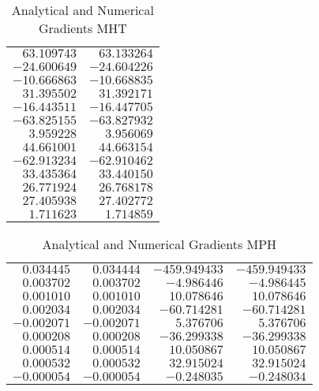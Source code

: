 \begin{table}[ht]
\caption{Analytical and Numerical Gradients MHT}
\begin{center}
\begin{tabular}{rr}
$63.109743$&$63.133264$\\
$-24.600649$&$-24.604226$\\
$-10.666863$&$-10.668835$\\
$31.395502$&$31.392171$\\
$-16.443511$&$-16.447705$\\
$-63.825155$&$-63.827932$\\
$3.959228$&$3.956069$\\
$44.661001$&$44.663154$\\
$-62.913234$&$-62.910462$\\
$33.435364$&$33.440150$\\
$26.771924$&$26.768178$\\
$27.405938$&$27.402772$\\
$1.711623$&$1.714859$\\
\end{tabular}
\end{center}
\end{table}
\begin{table}[ht]
\caption{Analytical and Numerical Gradients MPH}
\begin{center}
\begin{tabular}{rr|rr}
$0.034445$&$0.034444$&$-459.949433$&$-459.949433$\\
$0.003702$&$0.003702$&$-4.986446$&$-4.986445$\\
$0.001010$&$0.001010$&$10.078646$&$10.078646$\\
$0.002034$&$0.002034$&$-60.714281$&$-60.714281$\\
$-0.002071$&$-0.002071$&$5.376706$&$5.376706$\\
$0.000208$&$0.000208$&$-36.299338$&$-36.299338$\\
$0.000514$&$0.000514$&$10.050867$&$10.050867$\\
$0.000532$&$0.000532$&$32.915024$&$32.915024$\\
$-0.000054$&$-0.000054$&$-0.248035$&$-0.248034$\\
\end{tabular}
\end{center}
\end{table}

